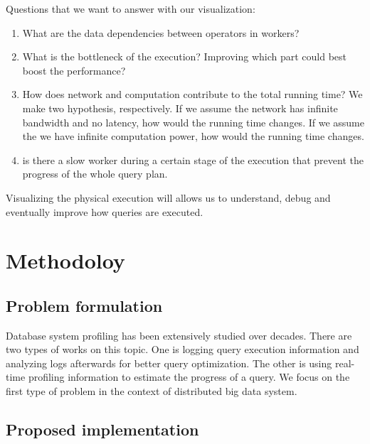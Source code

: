 \documentclass[11pt]{article}
\begin{document}
\vspace{10px}

\noindent Questions that we want to answer with our visualization:

\begin{enumerate}
	\item What are the data dependencies between operators in workers?
	\item What is the bottleneck of the execution? Improving which part could best boost the performance?
	\item How does network and computation contribute to the total running time? We make two hypothesis, respectively. If we assume the network has infinite bandwidth and no latency, how would the running time changes. If we assume the we have infinite computation power, how would the running time changes.
	\item is there a slow worker during a certain stage of the execution that prevent the progress of the whole query plan.

\end{enumerate}

Visualizing the physical execution will allows us to understand, debug and eventually improve how queries are executed.

\section{Methodoloy}
\subsection*{Problem formulation}
Database system profiling has been extensively studied over decades. There are two types of works on this topic. One is logging query execution information and analyzing logs afterwards for better query optimization. The other is using real-time profiling information to estimate the progress of a query. We focus on the first type of problem in the context of distributed big data system.

\subsection*{Proposed implementation}
\end{document}
